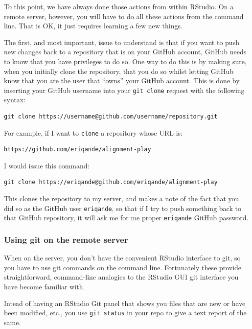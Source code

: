 \documentclass[]{krantz}
\begin{document}
To this point, we have always done those actions from within
RStudio. On a remote server, however, you will have to do all these
actions from the command line. That is OK, it just requires learning
a few new things.

The first, and most important, issue to understand is that if you want
to push new changes back to a repository that is on your GitHub account,
GitHub needs to know that you have privileges to do so. One way to
do this is by making sure, when you initially clone the repository,
that you do so whilst letting GitHub know that you are the user that
``owns'' your GitHub account. This is done by inserting your GitHub
username into your \texttt{git\ clone} request with the following syntax:

\begin{verbatim}
git clone https://username@github.com/username/repository.git
\end{verbatim}

For example, if I want to \texttt{clone} a repository whose URL is:

\begin{verbatim}
https://github.com/eriqande/alignment-play
\end{verbatim}

I would issue this command:

\begin{verbatim}
git clone https://eriqande@github.com/eriqande/alignment-play
\end{verbatim}

This clones the repository to my server, and makes
a note of the fact that you did so as the GitHub user \texttt{eriqande},
so that if I try to push something back to that GitHub repository,
it will ask me for me proper \texttt{eriqande} GitHub password.

\hypertarget{using-git-on-the-remote-server}{%
\subsubsection{Using git on the remote server}\label{using-git-on-the-remote-server}}

When on the server, you don't have the convenient RStudio interface
to git, so you have to use git commands on the command line. Fortunately
these provide straightforward, command-line analogies to the RStudio
GUI git interface you have become familiar with.

Intead of having an RStudio Git panel that shows you files that are new or
have been modified, etc., you use \texttt{git\ status} in your repo to give
a text report of the same.
\end{document}
